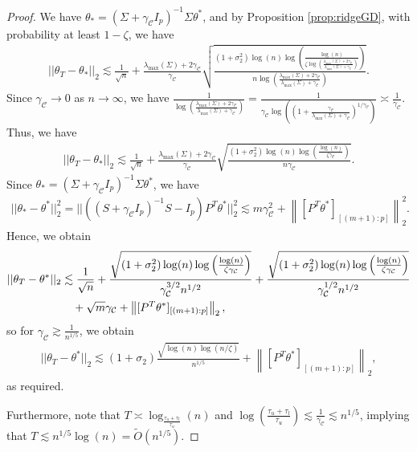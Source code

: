 \documentclass{article}
\begin{document}
\begin{proof}
We have $\theta_{*} = (\Sigma + \gamma_{\mathcal{C}}I_p)^{-1}\Sigma\theta^*$, and by Proposition \ref{prop:ridgeGD}, with probability at least $1 - \zeta$, we have
\begin{align*}
||\theta_T - \theta_{*}||_2 \lesssim \frac{1}{\sqrt{n}} + \frac{\lambda_{\max}(\Sigma) + 2\gamma_{\mathcal{C}}}{\gamma_{\mathcal{C}}}\sqrt{\frac{(1 + \sigma_2^2)\log(n)\log\left(\frac{\log(n)}{\zeta\log\left(\frac{\lambda_{\max}(\Sigma) + 2\gamma_{\mathcal{C}}}{\lambda_{\max}(\Sigma) + \gamma_{\mathcal{C}}}\right)}\right)}{n\log\left(\frac{\lambda_{\max}(\Sigma) + 2\gamma_{\mathcal{C}}}{\lambda_{\max}(\Sigma) + \gamma_{\mathcal{C}}}\right)}}.
\end{align*}
Since $\gamma_{\mathcal{C}} \rightarrow 0$ as $n \rightarrow \infty$, we have $\frac{1}{\log\left(\frac{\lambda_{\max}(\Sigma) + 2\gamma_{\mathcal{C}}}{\lambda_{\max}(\Sigma) + \gamma_{\mathcal{C}}}\right)} = \frac{1}{\gamma_{\mathcal{C}}\log\left(\left(1 + \frac{\gamma_{\mathcal{C}}}{\lambda_{\max}(\Sigma) + \gamma_{\mathcal{C}}}\right)^{1/\gamma_{\mathcal{C}}}\right)} \asymp \frac{1}{\gamma_{\mathcal{C}}}$. Thus, we have
\begin{align*}
||\theta_T - \theta_{*}||_2 \lesssim \frac{1}{\sqrt{n}} + \frac{\lambda_{\max}(\Sigma) + 2\gamma_{\mathcal{C}}}{\gamma_{\mathcal{C}}}\sqrt{\frac{(1 + \sigma_2^2)\log(n)\log\left(\frac{\log(n)}{\zeta\gamma_{\mathcal{C}}}\right)}{n\gamma_{\mathcal{C}}}}.
\end{align*}
Since $\theta_{*} = (\Sigma + \gamma_{\mathcal{C}}I_p)^{-1}\Sigma\theta^*$, we have
\begin{align*}
||\theta_{*} - \theta^*||_2^2 = ||((S + \gamma_{\mathcal{C}}I_p)^{-1}S - I_p)P^T\theta^*||_2^2 \lesssim m\gamma_{\mathcal{C}}^2 + \left\|[P^T\theta^*]_{[(m+1):p]}\right\|_2^2.
\end{align*}
Hence, we obtain
\begin{align}
\label{eq:HT_RI_MIN=0}
||\theta_T - \theta^*||_2 &\lesssim \frac{1}{\sqrt{n}} + \frac{\sqrt{(1 + \sigma_2^2)\log(n)\log\left(\frac{\log(n)}{\zeta\gamma_{\mathcal{C}}}\right)}}{\gamma_{\mathcal{C}}^{3/2}n^{1/2}} + \frac{\sqrt{(1 + \sigma_2^2)\log(n)\log\left(\frac{\log(n)}{\zeta\gamma_{\mathcal{C}}}\right)}}{\gamma_{\mathcal{C}}^{1/2}n^{1/2}} \notag\\
& \quad + \sqrt{m}\gamma_{\mathcal{C}} + \left\|[P^T\theta^*]_{[(m+1):p]}\right\|_2,
\end{align}
so for $\gamma_{\mathcal{C}} \gtrsim \frac{1}{n^{1/5}}$, we obtain
\begin{align*}
||\theta_T - \theta^*||_2 \lesssim (1 + \sigma_2)\frac{\sqrt{\log(n)\log\left(n/\zeta\right)}}{n^{1/5}} + \left\|[P^T\theta^*]_{[(m+1):p]}\right\|_2,
\end{align*}
as required.

Furthermore, note that $T \asymp \log_{\frac{\tau_u + \tau_l}{\tau_u}}(n)$ and $\log\left(\frac{\tau_u + \tau_l}{\tau_u}\right) \lesssim \frac{1}{\gamma_{\mathcal{C}}} \lesssim n^{1/5}$, implying that $T \lesssim n^{1/5}\log(n) = \widetilde{O}(n^{1/5})$.
\end{proof}
\end{document}
